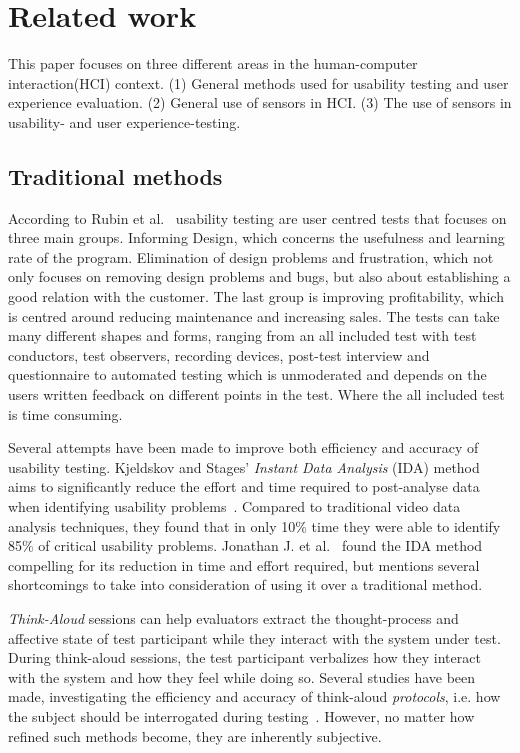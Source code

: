 \section{Related work}
This paper focuses on three different areas in the human-computer interaction(HCI) context. (1) General methods used for usability testing and user experience evaluation. (2) General use of sensors in HCI. (3) The use of sensors in usability- and user experience-testing.

\subsection{Traditional methods} %
According to Rubin et al.~\cite{rubin2008handbook} usability testing are user centred tests that focuses on three main groups.
Informing Design, which concerns the usefulness and learning rate of the program.
Elimination of design problems and frustration, which not only focuses on removing design problems and bugs, but also about establishing a good relation with the customer.
The last group is improving profitability, which is centred around reducing maintenance and increasing sales.
The tests can take many different shapes and forms, ranging from an all included test with test conductors, test observers, recording devices, post-test interview and questionnaire to automated testing which is unmoderated and depends on the users written feedback on different points in the test.
Where the all included test is time consuming.

Several attempts have been made to improve both efficiency and accuracy of
usability testing. Kjeldskov and Stages' \textit{Instant Data
Analysis} (IDA) method aims to significantly reduce the effort and time required
to post-analyse data when identifying usability
problems~\cite{instant_data_analysis}. Compared to traditional video data
analysis techniques, they found that in only 10\% time they were able to
identify 85\% of critical usability problems. Jonathan J. et
al.~\cite{use_of_TA_and_IDA} found the IDA
method compelling for its reduction in time and effort required, but mentions
several shortcomings to take into consideration of using it over a traditional
method.

\textit{Think-Aloud} sessions can help evaluators extract the thought-process
and affective state of test participant while they interact with the system
under test. During think-aloud sessions, the test participant verbalizes how
they interact with the system and how they feel while doing so.  Several studies
have been made, investigating the efficiency and accuracy of think-aloud
\textit{protocols}, i.e. how the subject should be interrogated during
testing~\cite{two_think_aloud_protocols_study}. However, no matter how refined
such methods become, they are inherently subjective.

